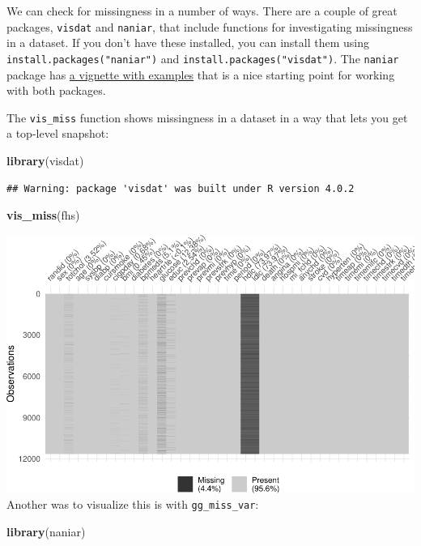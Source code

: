 \documentclass[
]{book}
\newenvironment{Shaded}{\begin{snugshade}}{\end{snugshade}}
\newcommand{\KeywordTok}[1]{\textcolor[rgb]{0.13,0.29,0.53}{\textbf{#1}}}
\newcommand{\NormalTok}[1]{#1}
\begin{document}
We can check for missingness in a number of ways. There are a couple of great
packages, \texttt{visdat} and \texttt{naniar}, that include functions for investigating
missingness in a dataset. If you don't have these installed, you can install
them using \texttt{install.packages("naniar")} and \texttt{install.packages("visdat")}. The
\texttt{naniar} package has \href{https://cran.r-project.org/web/packages/naniar/vignettes/getting-started-w-naniar.html}{a vignette with
examples}
that is a nice starting point for working with both packages.

The \texttt{vis\_miss} function shows missingness in a dataset in a way that lets you
get a top-level snapshot:

\begin{Shaded}
\begin{Highlighting}[]
\KeywordTok{library}\NormalTok{(visdat)}
\end{Highlighting}
\end{Shaded}

\begin{verbatim}
## Warning: package 'visdat' was built under R version 4.0.2
\end{verbatim}

\begin{Shaded}
\begin{Highlighting}[]
\KeywordTok{vis_miss}\NormalTok{(fhs)}
\end{Highlighting}
\end{Shaded}

\includegraphics{adv_epi_analysis_files/figure-latex/unnamed-chunk-152-1.pdf}
Another was to visualize this is with \texttt{gg\_miss\_var}:

\begin{Shaded}
\begin{Highlighting}[]
\KeywordTok{library}\NormalTok{(naniar)}
\end{Highlighting}
\end{Shaded}
\end{document}
